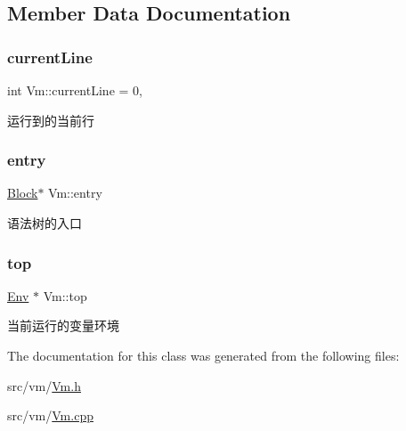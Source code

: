 \subsection{Member Data Documentation}
\mbox{\label{class_vm_acfa435ede93d1ba8fe2250fd3469de15}} 
\subsubsection{\texorpdfstring{current\+Line}{currentLine}}
{\footnotesize\ttfamily int Vm\+::current\+Line = 0\hspace{0.3cm}{\ttfamily [static]}, {\ttfamily [private]}}



运行到的当前行 

\mbox{\label{class_vm_ab5aae972ea15ddfd01362e27ed797a51}} 
\subsubsection{\texorpdfstring{entry}{entry}}
{\footnotesize\ttfamily \hyperlink{class_block}{Block}$\ast$ Vm\+::entry\hspace{0.3cm}{\ttfamily [protected]}}



语法树的入口 

\mbox{\label{class_vm_a1a83823801a5ab090d9ad20527a6c638}} 
\subsubsection{\texorpdfstring{top}{top}}
{\footnotesize\ttfamily \hyperlink{class_env}{Env} $\ast$ Vm\+::top\hspace{0.3cm}{\ttfamily [static]}}

当前运行的变量环境 

The documentation for this class was generated from the following files\+:\begin{DoxyCompactItemize}
\item 
src/vm/\hyperlink{_vm_8h}{Vm.\+h}\item 
src/vm/\hyperlink{_vm_8cpp}{Vm.\+cpp}\end{DoxyCompactItemize}
